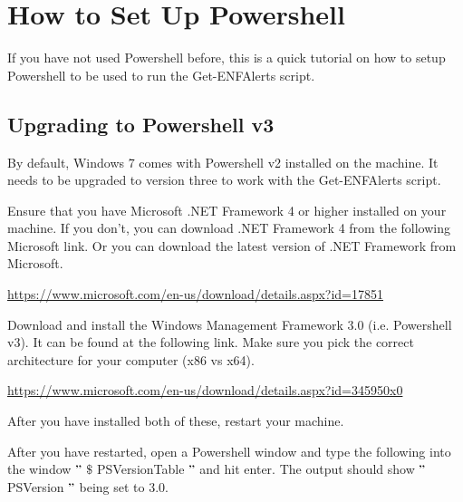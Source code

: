 \documentclass[a4paper,12pt]{report}
\begin{document}
\section*{How to Set Up Powershell}
 \par
If you have not used Powershell before, this is a quick tutorial on how to setup Powershell to be used to run the Get-ENFAlerts script. \par
\subsection*{Upgrading to Powershell v3}
 \par
By default, Windows 7 comes with Powershell v2 installed on the machine. It needs to be upgraded to version three to work with the Get-ENFAlerts script. \par
\begin{myEnumerate}
\item Ensure that you have Microsoft .NET Framework 4 or higher installed on your machine. If you don’t, you can download .NET Framework 4 from the following Microsoft link. Or you can download the latest version of .NET Framework from Microsoft. \par
\begin{myEnumerate}
\item \href{https://www.microsoft.com/en-us/download/details.aspx?id=17851}{https://www.microsoft.com/en-us/download/details.aspx?id=17851}
 \par
\end{myEnumerate}
\item Download and install the Windows Management Framework 3.0 (i.e. Powershell v3). It can be found at the following link. Make sure you pick the correct architecture for your computer (x86 vs x64). \par
\begin{myEnumerate}
\item \href{https://www.microsoft.com/en-us/download/details.aspx?id=345950x0}{https://www.microsoft.com/en-us/download/details.aspx?id=345950x0}
 \par
\end{myEnumerate}
\item After you have installed both of these, restart your machine.  \par
\item After you have restarted, open a Powershell window and type the following into the window  $ " $  $  \$  $ PSVersionTable $ " $  and hit enter. The output should show  $ " $ PSVersion $ " $  being set to 3.0. \par
\end{myEnumerate}
\end{document}
